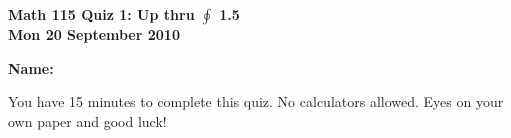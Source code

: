 \documentclass[11pt,letterpaper]{article}
\begin{document}
\flushleft
\begin{multicols}{2}


\begin{large}\textbf{Math 115 Quiz 1: Up thru $\oint $ 1.5 \\
Mon 20 September 2010}\end{large}

\textbf{Name:  }\underline{\hspace{35ex}}

\vspace{.5in}

\end{multicols}

\pagestyle{empty}


\flushleft

You have 15 minutes to complete this quiz.  No calculators allowed.  Eyes on your own paper and good luck!
\end{document}
